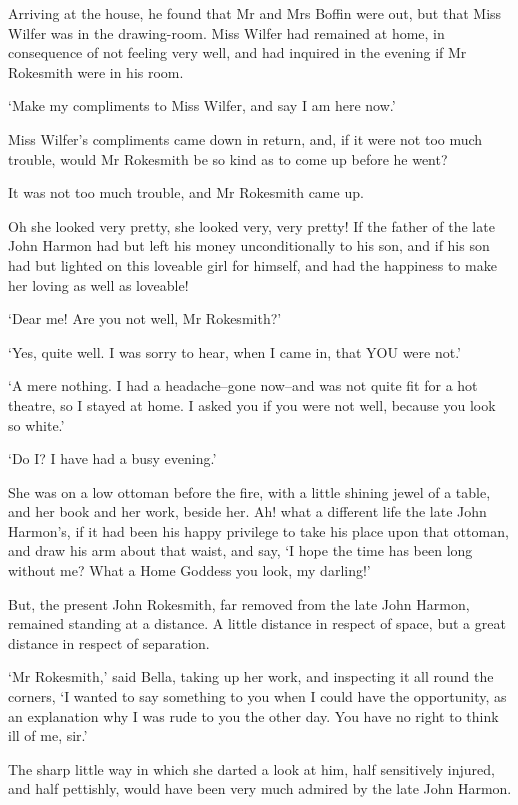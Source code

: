 Arriving at the house, he found that Mr and Mrs Boffin were out, but
that Miss Wilfer was in the drawing-room. Miss Wilfer had remained at
home, in consequence of not feeling very well, and had inquired in the
evening if Mr Rokesmith were in his room.

‘Make my compliments to Miss Wilfer, and say I am here now.’

Miss Wilfer’s compliments came down in return, and, if it were not too
much trouble, would Mr Rokesmith be so kind as to come up before he
went?

It was not too much trouble, and Mr Rokesmith came up.

Oh she looked very pretty, she looked very, very pretty! If the father
of the late John Harmon had but left his money unconditionally to his
son, and if his son had but lighted on this loveable girl for himself,
and had the happiness to make her loving as well as loveable!

‘Dear me! Are you not well, Mr Rokesmith?’

‘Yes, quite well. I was sorry to hear, when I came in, that YOU were
not.’

‘A mere nothing. I had a headache--gone now--and was not quite fit for
a hot theatre, so I stayed at home. I asked you if you were not well,
because you look so white.’

‘Do I? I have had a busy evening.’

She was on a low ottoman before the fire, with a little shining jewel
of a table, and her book and her work, beside her. Ah! what a different
life the late John Harmon’s, if it had been his happy privilege to take
his place upon that ottoman, and draw his arm about that waist, and say,
‘I hope the time has been long without me? What a Home Goddess you look,
my darling!’

But, the present John Rokesmith, far removed from the late John Harmon,
remained standing at a distance. A little distance in respect of space,
but a great distance in respect of separation.

‘Mr Rokesmith,’ said Bella, taking up her work, and inspecting it all
round the corners, ‘I wanted to say something to you when I could have
the opportunity, as an explanation why I was rude to you the other day.
You have no right to think ill of me, sir.’

The sharp little way in which she darted a look at him, half sensitively
injured, and half pettishly, would have been very much admired by the
late John Harmon.

